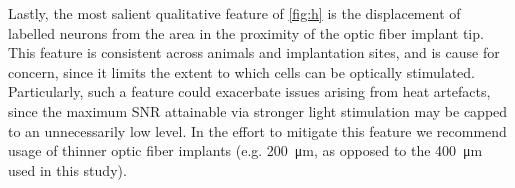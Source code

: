 Lastly, the most salient qualitative feature of \cref{fig:h} is the displacement of labelled neurons from the area in the proximity of the optic fiber implant tip.
This feature is consistent across animals and implantation sites, and is cause for concern, since it limits the extent to which cells can be optically stimulated.
Particularly, such a feature could exacerbate issues arising from heat artefacts, since the maximum SNR attainable via stronger light stimulation may be capped to an unnecessarily low level.
In the effort to mitigate this feature we recommend usage of thinner optic fiber implants (e.g. \SI{200}{\micro\meter}, as opposed to the \SI{400}{\micro\meter} used in this study).
